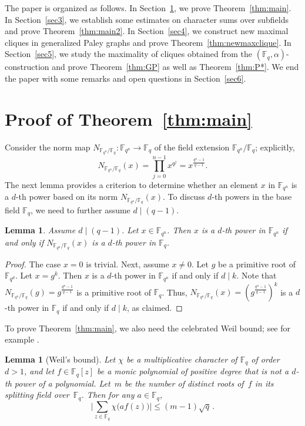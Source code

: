 \documentclass[12pt,reqno]{amsart}
\newtheorem{lem}[thm]{Lemma}
\theoremstyle{definition}
\newcommand{\F}{\mathbb{F}}
\begin{document}
\medskip

The paper is organized as follows.
In Section~\ref{sec2}, we prove Theorem~\ref{thm:main}. In Section~\ref{sec3}, we establish some estimates on character sums over subfields and prove Theorem~\ref{thm:main2}. In Section~\ref{sec4}, we construct new maximal cliques in generalized Paley graphs and prove Theorem~\ref{thm:newmaxclique}. In Section~\ref{sec5}, we study the maximality of cliques obtained from the $(\F_q,\alpha)$-construction and prove Theorem~\ref{thm:GP} as well as Theorem~\ref{thm:P*}. We end the paper with some remarks and open questions in Section~\ref{sec6}.


\section{Proof of Theorem~\ref{thm:main}}\label{sec2}

Consider the norm map $N_{\F_{q^n}/\F_q}\colon \F_{q^n} \to \F_q$ of the field extension $\F_{q^n}/\F_q$; explicitly, 
$$N_{\F_{q^n}/\F_q}(x)=\prod_{j=0}^{n-1} x^{q^j}=x^{\frac{q^n-1}{q-1}}.$$
The next lemma provides a criterion to determine whether an element $x$ in $\F_{q^n}$ is a $d$-th power based on its norm $N_{\F_{q^n}/\F_q}(x)$. To discuss $d$-th powers in the base field $\F_q$, we need to further assume $d \mid (q-1)$.

\begin{lem}\label{lem: norm_reduction}
Assume $d \mid (q-1)$. Let $x \in \F_{q^n}$. Then $x$ is a $d$-th power in $\F_{q^n}$ if and only if $N_{\F_{q^n}/\F_q}(x)$ is a $d$-th power in $\F_q$.
\end{lem}

\begin{proof}
The case $x=0$ is trivial. Next, assume $x \neq 0$. Let $g$ be a primitive root of $\F_{q^d}$.  Let $x=g^k$. Then $x$ is a $d$-th power in $\F_{q^n}$ if and only if $d \mid k$. Note that $N_{\F_{q^n}/\F_q}(g)=g^{\frac{q^n-1}{q-1}}$ is a primitive root of $\F_q$. Thus, $N_{\F_{q^n}/\F_q}(x)=(g^{\frac{q^n-1}{q-1}})^k$ is a $d$-th power in $\F_{q}$ if and only if $d \mid k$, as claimed.
\end{proof}

To prove Theorem~\ref{thm:main}, we also need the celebrated Weil bound; see for example \cite[Theorem~5.41]{LN97}.

\begin{lem}[Weil's bound]\label{lem:Weil}
Let $\chi$ be a multiplicative character of $\F_q$ of order $d>1$, and let $f \in \F_q[z]$ be a monic polynomial of positive degree that is not a $d$-th power of a polynomial. 
Let~$m$ be the number of distinct roots of~$f$ in its
splitting field over~$\F_q$. Then for any $a \in \F_q$,
$$\bigg |\sum_{z\in\mathbb{F}_q}\chi\big(af(z)\big) \bigg|\le(m-1)\sqrt q \,.$$
\end{lem}
\end{document}
